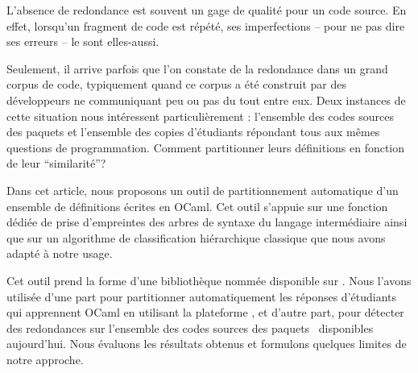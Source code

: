 L'absence de redondance est souvent un gage de qualité pour un code
source. En effet, lorsqu'un fragment de code est répété, ses
imperfections -- pour ne pas dire ses erreurs -- le sont elles-aussi.

Seulement, il arrive parfois que l'on constate de la redondance dans
un grand corpus de code, typiquement quand ce corpus a été construit
par des développeurs ne communiquant peu ou pas du tout entre
eux. Deux instances de cette situation nous intéressent
particulièrement : l'ensemble des codes sources des paquets {\Opam} et
l'ensemble des copies d'étudiants répondant tous aux mêmes questions
de programmation. Comment partitionner leurs définitions en fonction
de leur ``similarité''?

Dans cet article, nous proposons un outil de partitionnement
automatique d'un ensemble de définitions écrites en OCaml. Cet outil
s'appuie sur une fonction dédiée de prise d'empreintes des arbres de
syntaxe du langage intermédiaire {\LambdaCode} ainsi que sur un
algorithme de classification hiérarchique classique que nous avons
adapté à notre usage.

Cet outil prend la forme d'une bibliothèque nommée {\Asak} disponible
sur {\Opam}. Nous l'avons utilisée d'une part pour partitionner
automatiquement les réponses d'étudiants qui apprennent OCaml en
utilisant la plateforme {\LearnOCaml}, et d'autre part, pour détecter des
redondances sur l'ensemble des codes sources des paquets~{\Opam}
disponibles aujourd'hui. Nous évaluons les résultats obtenus et
formulons quelques limites de notre approche.
